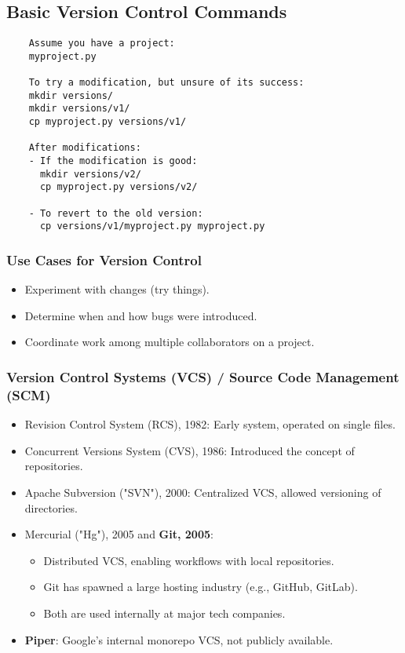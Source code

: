 \documentclass[12pt]{article}
\begin{document}
\subsection{Basic Version Control Commands}
\begin{verbatim}
    Assume you have a project:
    myproject.py
    
    To try a modification, but unsure of its success:
    mkdir versions/
    mkdir versions/v1/
    cp myproject.py versions/v1/
    
    After modifications:
    - If the modification is good:
      mkdir versions/v2/
      cp myproject.py versions/v2/
    
    - To revert to the old version:
      cp versions/v1/myproject.py myproject.py
\end{verbatim}

\subsubsection{Use Cases for Version Control}
\begin{itemize}
    \item Experiment with changes (try things).
    \item Determine when and how bugs were introduced.
    \item Coordinate work among multiple collaborators on a project.
\end{itemize}

\subsubsection{Version Control Systems (VCS) / Source Code Management (SCM)}
\begin{itemize}
    \item Revision Control System (RCS), 1982: Early system, operated on single files.
    \item Concurrent Versions System (CVS), 1986: Introduced the concept of repositories.
    \item Apache Subversion ("SVN"), 2000: Centralized VCS, allowed versioning of directories.
    \item Mercurial ("Hg"), 2005 and \textbf{Git, 2005}:
    \begin{itemize}
        \item Distributed VCS, enabling workflows with local repositories.
        \item Git has spawned a large hosting industry (e.g., GitHub, GitLab).
        \item Both are used internally at major tech companies.
    \end{itemize}
    \item \textbf{Piper}: Google's internal monorepo VCS, not publicly available.
\end{itemize}
\end{document}
